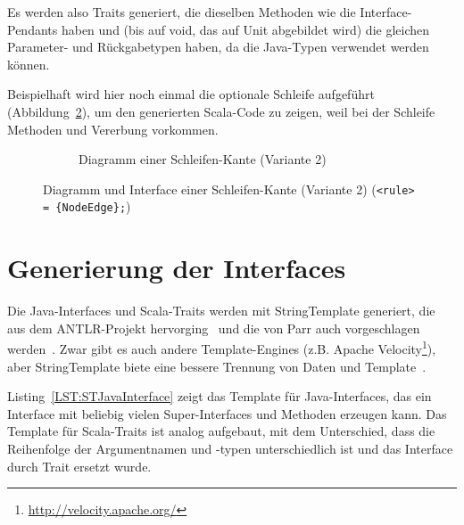 \documentclass[../InterneDSLs.tex]{subfiles}
\begin{document}
Es werden also Traits generiert, die dieselben Methoden wie die Interface-Pendants haben und (bis auf void, das auf Unit abgebildet wird) die gleichen Parameter- und Rückgabetypen haben, da die Java-Typen verwendet werden können.

Beispielhaft wird hier noch einmal die optionale Schleife aufgeführt (Abbildung~\ref{FIG:ScalaLoopNodeAlt}), um den generierten Scala-Code zu zeigen, weil bei der Schleife Methoden und Vererbung vorkommen.
\begin{figure}[ht]
\centering
  \begin{subfigure}[c]{0.49\textwidth}
    \caption{Diagramm einer Schleifen-Kante (Variante 2)}
    \label{FIG:ScalaDiagramLoopNodeAlt}
  \end{subfigure}
  \begin{subfigure}[c]{0.49\textwidth}
    
  \end{subfigure}
  \caption[Abbildung einer Sequenz auf einen Sala-Trait]{Diagramm und Interface einer Schleifen-Kante (Variante 2) (\texttt{<rule> = \{NodeEdge\};})}
  \label{FIG:ScalaLoopNodeAlt}
\end{figure}


\section{Generierung der Interfaces}
Die Java-Interfaces und Scala-Traits werden mit StringTemplate generiert, die aus dem ANTLR-Projekt hervorging~\cite{stringtemplate.github} und die von Parr auch vorgeschlagen werden~\cite[S. 313 ff]{Parr.2010}. Zwar gibt es auch andere Template-Engines (z.B. Apache Velocity\footnote{\url{http://velocity.apache.org/}}), aber StringTemplate biete eine bessere Trennung von Daten und Template~\cite{parr2004enforcing}.

Listing~\ref{LST:STJavaInterface} zeigt das Template für Java-Interfaces, das ein Interface mit beliebig vielen Super-Interfaces und Methoden erzeugen kann. Das Template für Scala-Traits ist analog aufgebaut, mit dem Unterschied, dass die Reihenfolge der Argumentnamen und -typen unterschiedlich ist und das Interface durch Trait ersetzt wurde.
\end{document}
